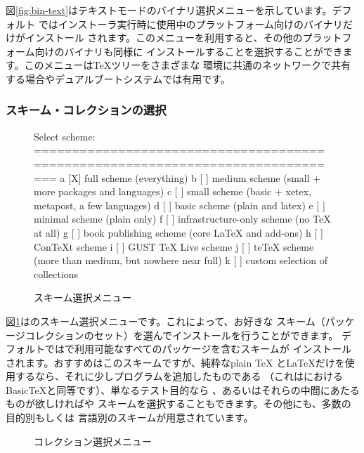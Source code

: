 \documentclass[uplatex,dvipdfmx,12pt,tombow]{jsarticle}
\begin{document}
図\ref{fig:bin-text}はテキストモードのバイナリ選択メニューを示しています。デフォルト
ではインストーラ実行時に使用中のプラットフォーム向けのバイナリだけがインストール
されます。このメニューを利用すると、その他のプラットフォーム向けのバイナリも同様に
インストールすることを選択することができます。このメニューは\TeX ツリーをさまざまな
環境に共通のネットワークで共有する場合やデュアルブートシステムでは有用です。

\subsubsection{スキーム・コレクションの選択}
\label{sec:components}

\begin{figure}[tbh]
\begin{boxedverbatim}
Select scheme:
===============================================================================
 a [X] full scheme (everything)
 b [ ] medium scheme (small + more packages and languages)
 c [ ] small scheme (basic + xetex, metapost, a few languages)
 d [ ] basic scheme (plain and latex)
 e [ ] minimal scheme (plain only)
 f [ ] infrastructure-only scheme (no TeX at all)
 g [ ] book publishing scheme (core LaTeX and add-ons)
 h [ ] ConTeXt scheme
 i [ ] GUST TeX Live scheme
 j [ ] teTeX scheme (more than medium, but nowhere near full)
 k [ ] custom selection of collections
\end{boxedverbatim}
\vspace{-1zh}
\caption{スキーム選択メニュー}\label{fig:scheme-text}
\end{figure}

図\ref{fig:scheme-text}は\TL のスキーム選択メニューです。これによって、お好きな
スキーム（パッケージコレクションのセット）を選んでインストールを行うことができます。
デフォルトでは\TL で利用可能なすべてのパッケージを含むスキームが
インストールされます。おすすめはこのスキームですが、純粋なplain \TeX
と\LaTeX だけを使用するなら、それに少しプログラムを追加したものである
（これは\MacTeX におけるBasic\TeX と同等です）、単なるテスト目的なら
、あるいはそれらの中間にあたるものが欲しければや
スキームを選択することもできます。その他にも、多数の目的別もしくは
言語別のスキームが用意されています。

\begin{figure}[tb]
\centering {}
\caption{コレクション選択メニュー}\label{fig:collections-gui}
\end{figure}
\end{document}

